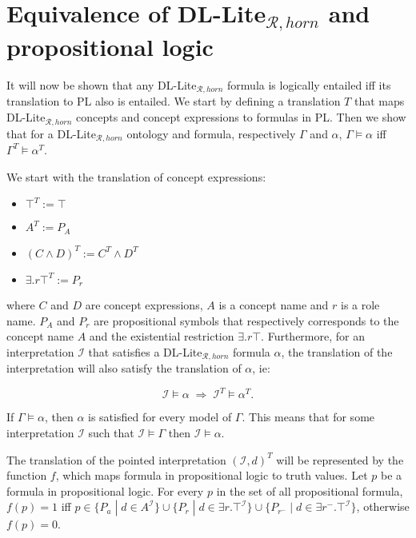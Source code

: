 \chapter{Equivalence of DL-Lite$_{\mathcal{R}, horn}$ and propositional logic}

\newtheorem{lemma}{Lemma}

It will now be shown that any DL-Lite$_{\mathcal{R}, horn}$ formula is logically entailed iff its translation to PL also is entailed. We start by defining a translation $T$ that maps DL-Lite$_{\mathcal{R}, horn}$ concepts and concept expressions to formulas in PL. Then we show that for a DL-Lite$_{\mathcal{R}, horn}$ ontology and formula, respectively $\Gamma$ and $\alpha$, $\Gamma \models \alpha$ iff $\Gamma^T \models \alpha^T$.

We start with the translation of concept expressions:
\begin{itemize}
    \item $\top^T := \top$
    \item $A^T := P_A$
    \item $(C \wedge D)^T := C^T \wedge D^T$
    \item ${\exists .r\top}^T := P_r$
\end{itemize}
 where $C$ and $D$ are concept expressions, $A$ is a concept name and $r$ is a role name. $P_A$ and $P_r$ are propositional symbols that respectively corresponds to the concept name $A$ and the existential restriction $\exists .r\top$. Furthermore, for an interpretation $\mathcal{I}$ that satisfies a DL-Lite$_{\mathcal{R}, horn}$ formula $\alpha$, the translation of the interpretation will also satisfy the translation of $\alpha$, ie:
 
 \[\mathcal{I} \models \alpha \; \Rightarrow \;  \mathcal{I}^T \models \alpha^T.\]
 
If $\Gamma \models \alpha$, then $\alpha$ is satisfied for every model of $\Gamma$. This means that for some interpretation $\mathcal{I}$ such that $\mathcal{I} \models \Gamma$ then $\mathcal{I} \models \alpha$.

The translation of the pointed interpretation $(\mathcal{I}, d)^T$ will be represented by the function $f$, which maps formula in propositional logic to truth values. Let $p$ be a formula in propositional logic. For every $p$ in the set of all propositional formula, $f(p)=1$ iff $p\in \{P_a \; | \; d\in A^{\mathcal{I}}\}\cup\{P_r \; | \; d\in {\exists r.\top}^{\mathcal{I}}\}\cup \{P_{r^-} \; | \; d \in {\exists r^{-}.\top}^{\mathcal{I}}\}$, otherwise $f(p)=0$.
 
